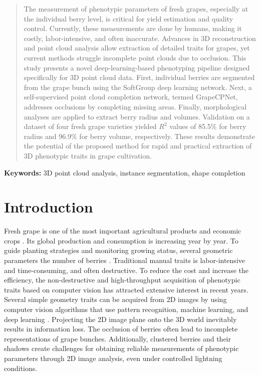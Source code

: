 \documentclass[12pt]{article}
\begin{document}
\begin{abstract}
The measurement of phenotypic parameters of fresh grapes, especially at the individual berry level, is critical for yield estimation and quality control. 
Currently, these measurements are done by humans, making it costly, labor-intensive, and often inaccurate. 
Advances in 3D reconstruction and point cloud analysis allow extraction of detailed traits for grapes, yet current methods struggle incomplete point clouds due to occlusion. 
This study presents a novel deep-learning-based phenotyping pipeline designed specifically for 3D point cloud data.                                                         
First, individual berries are segmented from the grape bunch using the SoftGroup deep learning network. 
Next, a self-supervised point cloud completion network, termed GrapeCPNet, addresses occlusions by completing missing areas.  
Finally, morphological analyses are applied to extract berry radius and volumes. 
Validation on a dataset of four fresh grape varieties yielded  $R^2$ values of 85.5\% for berry radius and 96.9\% for berry volume, respectively. 
These results demonstrate the potential of the proposed method for rapid and practical extraction of 3D phenotypic traits in grape cultivation.
\end{abstract}

\textbf{Keywords:} 3D point cloud analysis, instance segmentation, shape completion

\doublespacing

\section{Introduction}
Fresh grape is one of the most important agricultural products and economic crops \citep{alston_grapes_2019}. 
Its global production and consumption is increasing year by year. 
To  guide planting strategies and monitoring growing status, several geometric parameters 
 the number of  berries . 
Traditional manual traits is labor-intensive and time-consuming, and often destructive. 
To reduce the cost and increase the efficiency, the non-destructive and high-throughput acquisition of phenotypic traits based on computer vision has attracted extensive interest in recent years. 
Several simple geometry traits can be acquired from 2D images by using computer vision algorithms that use pattern recognition, machine learning, and deep learning \citep{chen_instance_2023, zabawa_counting_2020}. 
Projecting the 2D image plane onto the 3D world inevitably results in information loss. 
The occlusion of berries often lead to incomplete representations of grape bunches. 
Additionally, clustered berries and their shadows create challenges for obtaining reliable measurements of phenotypic parameters through 2D image analysis, even under controlled lightning conditions.
\end{document}
